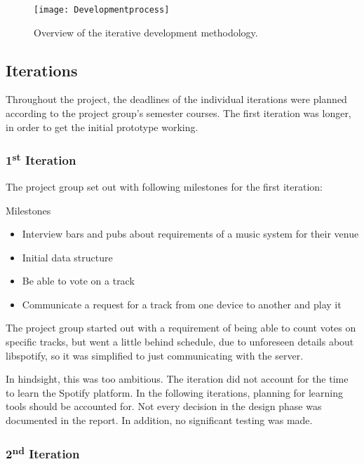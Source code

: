 \begin{figure}[hbtp]
  \centering
  \texttt{[image: Developmentprocess]}
  \caption{Overview of the iterative development methodology.}\label{fig:developmentprocess}
\end{figure}

\subsection{Iterations}

Throughout the project, the deadlines of the individual iterations were planned according to the project group's semester courses. The first iteration was longer, in order to get the initial prototype working.

\subsubsection{1\textsuperscript{st} Iteration}

The project group set out with following milestones for the first iteration:

Milestones
\begin{itemize}
        \item Interview bars and pubs about requirements of a music system for their venue
        \item Initial data structure
        \item Be able to vote on a track
        \item Communicate a request for a track from one device to another and play it
\end{itemize}

The project group started out with a requirement of being able to count votes on specific tracks, but went a little behind schedule, due to unforeseen details about libspotify, so it was simplified to just communicating with the server.

In hindsight, this was too ambitious. The iteration did not account
for the time to learn the Spotify platform. In the following iterations, planning for learning tools should be accounted for. Not every decision in the design phase was documented in the report. In addition, no significant testing was made.

\subsubsection{2\textsuperscript{nd} Iteration}


